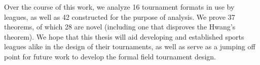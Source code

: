 {    Over the course of this work, we analyze 16 tournament formats in use by leagues, as well as 42 constructed for the purpose of analysis. We prove 37 theorems, of which 28 are novel (including one that disproves the Hwang's theorem). We hope that this thesis will aid developing and established sports leagues alike in the design of their tournaments, as well as serve as a jumping off point for future work to develop the formal field tournament design.




}



    
    




